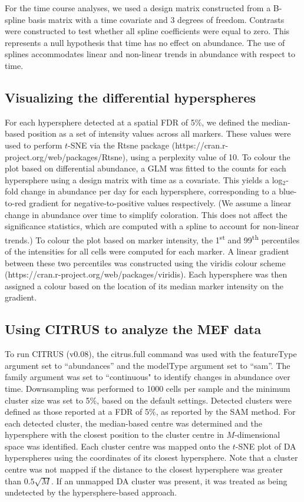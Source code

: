\documentclass{article}
\begin{document}
For the time course analyses, we used a design matrix constructed from a B-spline basis matrix with a time covariate and 3 degrees of freedom.
Contrasts were constructed to test whether all spline coefficients were equal to zero.
This represents a null hypothesis that time has no effect on abundance.
The use of splines accommodates linear and non-linear trends in abundance with respect to time.

\subsection{Visualizing the differential hyperspheres}
For each hypersphere detected at a spatial FDR of 5\%, we defined the median-based position as a set of intensity values across all markers.
These values were used to perform $t$-SNE via the Rtsne package (https://cran.r-project.org/web/packages/Rtsne), using a perplexity value of 10.
To colour the plot based on differential abundance, a GLM was fitted to the counts for each hypersphere using a design matrix with time as a covariate.
This yields a log$_2$-fold change in abundance per day for each hypersphere, corresponding to a blue-to-red gradient for negative-to-positive values respectively.
(We assume a linear change in abundance over time to simplify coloration.
This does not affect the significance statistics, which are computed with a spline to account for non-linear trends.)
To colour the plot based on marker intensity, the 1\textsuperscript{st} and 99\textsuperscript{th} percentiles of the intensities for all cells were computed for each marker.
A linear gradient between these two percentiles was constructed using the viridis colour scheme (https://cran.r-project.org/web/packages/viridis).
Each hypersphere was then assigned a colour based on the location of its median marker intensity on the gradient. 

\subsection{Using CITRUS to analyze the MEF data}
To run CITRUS (v0.08), the citrus.full command was used with the featureType argument set to ``abundances'' and the modelType argument set to ``sam''.
The family argument was set to ``continuous" to identify changes in abundance over time. 
Downsampling was performed to 1000 cells per sample and the minimum cluster size was set to 5\%, based on the default settings.
Detected clusters were defined as those reported at a FDR of 5\%, as reported by the SAM method.
For each detected cluster, the median-based centre was determined and the hypersphere with the closest position to the cluster centre in $M$-dimensional space was identified.
Each cluster centre was mapped onto the $t$-SNE plot of DA hyperspheres using the coordinates of its closest hypersphere.
Note that a cluster centre was not mapped if the distance to the closest hypersphere was greater than $0.5\sqrt{M}$.
If an unmapped DA cluster was present, it was treated as being undetected by the hypersphere-based approach.
\end{document}
